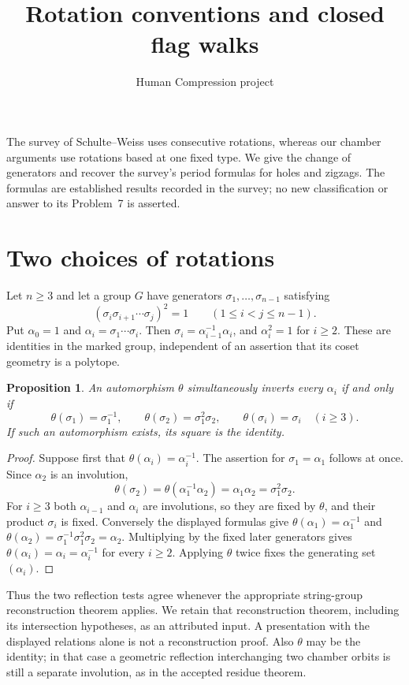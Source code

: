 \documentclass[11pt,a4paper]{article}
\title{Rotation conventions and closed flag walks}
\author{Human Compression project}\date{}
\newtheorem{proposition}{Proposition}
\begin{document}
\maketitle
The survey of Schulte--Weiss uses consecutive rotations, whereas our
chamber arguments use rotations based at one fixed type. We give the
change of generators and recover the survey's period formulas for holes
and zigzags. The formulas are established results recorded in the survey;
no new classification or answer to its Problem~7 is asserted.

\section{Two choices of rotations}
Let $n\geq3$ and let a group $G$ have generators $\sigma_1,\ldots,\sigma_{n-1}$ satisfying
\[
 (\sigma_i\sigma_{i+1}\cdots\sigma_j)^2=1
 \qquad(1\leq i<j\leq n-1).
\]
Put $\alpha_0=1$ and $\alpha_i=\sigma_1\cdots\sigma_i$. Then
$\sigma_i=\alpha_{i-1}^{-1}\alpha_i$, and $\alpha_i^2=1$ for $i\geq2$.
These are identities in the marked group, independent of an assertion
that its coset geometry is a polytope.

\begin{proposition}
An automorphism $\theta$ simultaneously inverts every $\alpha_i$ if and
only if
\[
 \theta(\sigma_1)=\sigma_1^{-1},\qquad
 \theta(\sigma_2)=\sigma_1^2\sigma_2,\qquad
 \theta(\sigma_i)=\sigma_i\quad(i\geq3).
\]
If such an automorphism exists, its square is the identity.
\end{proposition}
\begin{proof}
Suppose first that $\theta(\alpha_i)=\alpha_i^{-1}$. The assertion for
$\sigma_1=\alpha_1$ follows at once. Since $\alpha_2$ is an involution,
\[
 \theta(\sigma_2)=\theta(\alpha_1^{-1}\alpha_2)
 =\alpha_1\alpha_2=\sigma_1^2\sigma_2.
\]
For $i\geq3$ both $\alpha_{i-1}$ and $\alpha_i$ are involutions, so they
are fixed by $\theta$, and their product $\sigma_i$ is fixed.
Conversely the displayed formulas give
$\theta(\alpha_1)=\alpha_1^{-1}$ and
$\theta(\alpha_2)=\sigma_1^{-1}\sigma_1^2\sigma_2=\alpha_2$.
Multiplying by the fixed later generators gives
$\theta(\alpha_i)=\alpha_i=\alpha_i^{-1}$ for every $i\geq2$.
Applying $\theta$ twice fixes the generating set $(\alpha_i)$.
\end{proof}
Thus the two reflection tests agree whenever the appropriate
string-group reconstruction theorem applies. We retain that reconstruction
theorem, including its intersection hypotheses, as an attributed input.
A presentation with the displayed relations alone is not a reconstruction
proof. Also $\theta$ may be the identity; in that case a geometric
reflection interchanging two chamber orbits is still a separate
involution, as in the accepted residue theorem.
\end{document}
